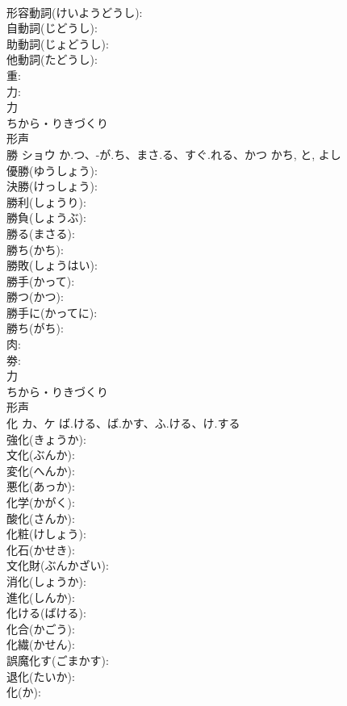 \documentclass[8pt]{extreport}
\begin{document}
\begin{CJK}{UTF8}{min}
\\	形容動詞(けいようどうし): 
\\	自動詞(じどうし): 
\\	助動詞(じょどうし): 
\\	他動詞(たどうし): 
\\	重: 
\\	力: 
\\	力	
\\	ちから・りきづくり	
\\	形声 
\\	勝	ショウ	か.つ、-が.ち、まさ.る、すぐ.れる、かつ	かち, と, よし	
\\	優勝(ゆうしょう): 
\\	決勝(けっしょう): 
\\	勝利(しょうり): 
\\	勝負(しょうぶ): 
\\	勝る(まさる): 
\\	勝ち(かち): 
\\	勝敗(しょうはい): 
\\	勝手(かって): 
\\	勝つ(かつ): 
\\	勝手に(かってに): 
\\	勝ち(がち): 
\\	肉: 
\\	劵: 
\\	力	
\\	ちから・りきづくり	
\\	形声 
\\	化	カ、ケ	ば.ける、ば.かす、ふ.ける、け.する		
\\	強化(きょうか): 
\\	文化(ぶんか): 
\\	変化(へんか): 
\\	悪化(あっか): 
\\	化学(かがく): 
\\	酸化(さんか): 
\\	化粧(けしょう): 
\\	化石(かせき): 
\\	文化財(ぶんかざい): 
\\	消化(しょうか): 
\\	進化(しんか): 
\\	化ける(ばける): 
\\	化合(かごう): 
\\	化繊(かせん): 
\\	誤魔化す(ごまかす): 
\\	退化(たいか): 
\\	化(か): 

\end{CJK}
\end{document}
